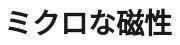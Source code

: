 \documentclass{report}
\begin{document}
  \maketitle
  \tableofcontents
  \chapter{ミクロな磁性}
\end{document}
